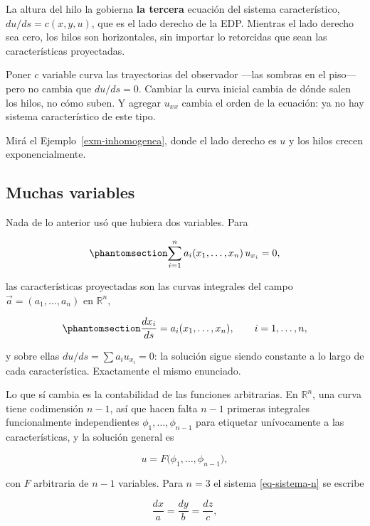 \documentclass[
  spanish,
  a4paper,
]{scrbook}
\theoremstyle{definition}
\theoremstyle{plain}
\theoremstyle{definition}
\theoremstyle{plain}
\theoremstyle{definition}
\theoremstyle{remark}
\begin{document}
La altura del hilo la gobierna \textbf{la tercera} ecuación del sistema
característico, \(du/ds = c(x,y,u)\), que es el lado derecho de la EDP.
Mientras el lado derecho sea cero, los hilos son horizontales, sin
importar lo retorcidas que sean las características proyectadas.

Poner \(c\) variable curva las trayectorias del observador ---las
sombras en el piso--- pero no cambia que \(du/ds=0\). Cambiar la curva
inicial cambia de dónde salen los hilos, no cómo suben. Y agregar
\(u_{xx}\) cambia el orden de la ecuación: ya no hay sistema
característico de este tipo.

Mirá el Ejemplo~\ref{exm-inhomogenea}, donde el lado derecho es \(u\) y
los hilos crecen exponencialmente.

\subsection{Muchas variables}\label{sec-primer-orden-n}

Nada de lo anterior usó que hubiera dos variables. Para

\begin{equation}\protect\phantomsection\label{eq-primer-orden-n}{
\sum_{i=1}^{n} a_i(x_1,\dots,x_n)\, u_{x_i} = 0 ,
}\end{equation}

las características proyectadas son las curvas integrales del campo
\(\vec a = (a_1,\dots,a_n)\) en \(\mathbb{R}^n\),

\begin{equation}\protect\phantomsection\label{eq-sistema-n}{
\frac{dx_i}{ds} = a_i(x_1,\dots,x_n), \qquad i = 1,\dots,n,
}\end{equation}

y sobre ellas \(du/ds = \sum a_i u_{x_i} = 0\): la solución sigue siendo
constante a lo largo de cada característica. Exactamente el mismo
enunciado.

Lo que sí cambia es la contabilidad de las funciones arbitrarias. En
\(\mathbb{R}^n\), una curva tiene codimensión \(n-1\), así que hacen
falta \(n-1\) primeras integrales funcionalmente independientes
\(\phi_1,\dots,\phi_{n-1}\) para etiquetar unívocamente a las
características, y la solución general es

\[
u = F\big(\phi_1,\dots,\phi_{n-1}\big),
\]

con \(F\) arbitraria de \(n-1\) variables. Para \(n=3\) el sistema
\ref{eq-sistema-n} se escribe

\[
\frac{dx}{a} = \frac{dy}{b} = \frac{dz}{c} ,
\]
\end{document}
